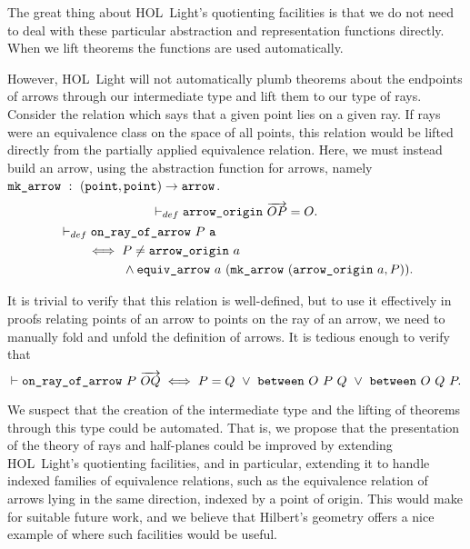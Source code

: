 The great thing about HOL~Light's quotienting facilities is that we do not need to deal with these particular abstraction and representation functions directly. When we lift theorems the functions are used automatically. 

However, HOL~Light will not automatically plumb theorems about the endpoints of arrows through our intermediate type and lift them to our type of rays. Consider the relation which says that a given point lies on a given ray. If rays were an equivalence class on the space of all points, this relation would be lifted directly from the partially applied equivalence relation. Here, we must instead build an arrow, using the abstraction function for arrows, namely $\code{mk\_arrow}\ :\ (\code{point},\code{point})\rightarrow\code{arrow}$.
\begin{gather*}
  \vdash_{def}\code{arrow\_origin}\ \overrightarrow{OP} = O.\\
  \begin{split}
    &\vdash_{def}\code{on\_ray\_of\_arrow}\ P\ \code{a}\\
    &\qquad\iff P \neq \code{arrow\_origin}\ a\\
    &\qquad\qquad\quad\wedge \code{equiv\_arrow}\ a\ (\code{mk\_arrow}\ (\code{arrow\_origin}\ a, P)).
  \end{split}
\end{gather*}

It is trivial to verify that this relation is well-defined, but to use it effectively in proofs relating points of an arrow to points on the ray of an arrow, we need to manually fold and unfold the definition of arrows. It is tedious enough to verify that
\begin{equation*}
  \vdash\code{on\_ray\_of\_arrow}\ P\ \overrightarrow{OQ} \iff P = Q\ \vee\ \between{O}{P}{Q}\ \vee\ \between{O}{Q}{P}.
\end{equation*}

We suspect that the creation of the intermediate  type and the lifting of theorems through this type could be automated. That is, we propose that the presentation of the theory of rays and half-planes could be improved by extending HOL~Light's quotienting facilities, and in particular, extending it to handle indexed families of equivalence relations, such as the equivalence relation of arrows lying in the same direction, indexed by a point of origin. This would make for suitable future work, and we believe that Hilbert's geometry offers a nice example of where such facilities would be useful.

